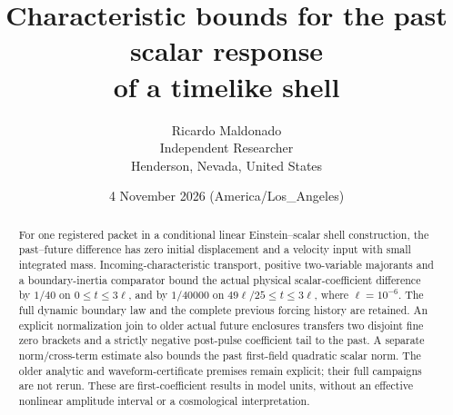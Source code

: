 \documentclass[11pt]{article}
\title{Characteristic bounds for the past scalar response\protect\\ of a timelike shell}
\author{Ricardo Maldonado\protect\\\small Independent Researcher\protect\\\small Henderson, Nevada, United States}
\date{4 November 2026 (America/Los\_Angeles)}
\begin{document}
\maketitle
\begin{abstract}
For one registered packet in a conditional linear Einstein--scalar shell
construction, the past--future difference has zero initial displacement and
a velocity input with small integrated mass. Incoming-characteristic transport, positive
two-variable majorants and a boundary-inertia comparator bound the actual
physical scalar-coefficient difference by $1/40$ on $0\le t\le3\ell$, and by
$1/40000$ on $49\ell/25\le t\le3\ell$, where $\ell=10^{-6}$.
The full dynamic boundary law and the complete previous forcing history
are retained. An explicit normalization join to older actual future
enclosures transfers two disjoint fine zero brackets and a strictly negative
post-pulse coefficient tail to the past. A separate norm/cross-term estimate
also bounds the past first-field quadratic scalar norm. The older analytic
and waveform-certificate premises remain explicit; their full campaigns
are not rerun. These are first-coefficient results in model units, without
an effective nonlinear amplitude interval or a cosmological interpretation.
\end{abstract}
\end{document}
